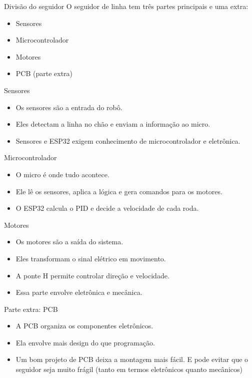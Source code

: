\documentclass[10pt]{beamer}
\begin{document}
\begin{frame}{Divisão do seguidor}
  O seguidor de linha tem três partes principais e uma extra:
  \begin{itemize}
    \item Sensores
    \item Microcontrolador
    \item Motores
    \item PCB (parte extra)
  \end{itemize}
\end{frame}

\begin{frame}{Sensores}
  \begin{itemize}
    \item Os sensores são a entrada do robô.
    \item Eles detectam a linha no chão e enviam a informação ao micro.
    \item Sensores e ESP32 exigem conhecimento de microcontrolador e eletrônica.
  \end{itemize}
\end{frame}

\begin{frame}{Microcontrolador}
  \begin{itemize}
    \item O micro é onde tudo acontece.
    \item Ele lê os sensores, aplica a lógica e gera comandos para os motores.
    \item O ESP32 calcula o PID e decide a velocidade de cada roda.
  \end{itemize}
\end{frame}

\begin{frame}{Motores}
  \begin{itemize}
    \item Os motores são a saída do sistema.
    \item Eles transformam o sinal elétrico em movimento.
    \item A ponte H permite controlar direção e velocidade.
    \item Essa parte envolve eletrônica e mecânica.
  \end{itemize}
\end{frame}

\begin{frame}{Parte extra: PCB}
  \begin{itemize}
    \item A PCB organiza os componentes eletrônicos.
    \item Ela envolve mais design do que programação.
    \item Um bom projeto de PCB deixa a montagem mais fácil. E pode evitar que o seguidor seja muito frágil (tanto em termos eletrônicos quanto mecânicos)
  \end{itemize}
\end{frame}
\end{document}
